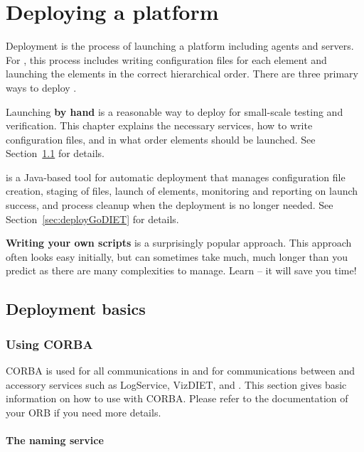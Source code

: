 \chapter{Deploying a \diet platform}
\label{ch:deploying}

Deployment is the process of launching a \diet platform including agents and
servers.  For \diet, this process includes writing configuration files for each
element and launching the elements in the correct hierarchical order. There are
three primary ways to deploy \diet.

Launching \textbf{by hand} is a reasonable way to deploy \diet for small-scale
testing and verification. This chapter explains the  necessary services, how to
write \diet configuration files, and in what order \diet elements should be
launched.  See Section~\ref{sec:deployBasics} for details.

\textbf{\godiet} is a Java-based tool for automatic \diet deployment that
manages configuration file creation, staging of files, launch of elements,
monitoring and reporting on launch success, and process cleanup when the \diet
deployment is no longer needed.   See  Section~\ref{sec:deployGoDIET} for
details.

\textbf{Writing your own scripts} is a surprisingly popular approach.  This
approach often looks easy initially, but can sometimes take much, much longer
than you predict as there are many complexities to manage.  Learn \godiet -- it
will save you time!



\section{Deployment basics}
\label{sec:deployBasics}

\subsection{Using CORBA} 
\label{sec:CORBA_services}

CORBA is used for all communications in \diet and for communications between
\diet and accessory services such as LogService, VizDIET, and \godiet.  This
section gives basic information on how to use \diet with CORBA.  Please refer
to the documentation of your ORB if you need more details.

\subsubsection{The naming service}

